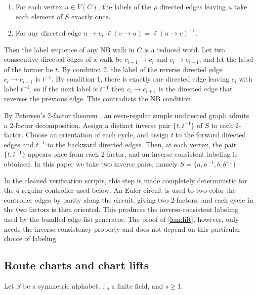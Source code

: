 \documentclass[11pt]{article}
\theoremstyle{definition}
\theoremstyle{remark}
\providecommand{\tightlist}{\setlength{\itemsep}{0pt}\setlength{\parskip}{0pt}}
\renewcommand{\_}{\textunderscore\allowbreak}
\begin{document}
\begin{enumerate}
\def\labelenumi{\arabic{enumi}.}
\tightlist
\item
  For each vertex \(u\in V(C)\), the labels of the \(\rho\) directed
  edges leaving \(u\) take each element of \(S\) exactly once.
\item
  For any directed edge \(u\to v\), \(\ell(v\to u)=\ell(u\to v)^{-1}\).
\end{enumerate}

Then the label sequence of any NB walk in \(C\) is a reduced word. Let
two consecutive directed edges of a walk be \(c_{i-1}\to c_i\) and
\(c_i\to c_{i+1}\), and let the label of the former be \(t\). By
condition 2, the label of the reverse directed edge \(c_i\to c_{i-1}\)
is \(t^{-1}\). By condition 1, there is exactly one directed edge
leaving \(c_i\) with label \(t^{-1}\), so if the next label is
\(t^{-1}\) then \(c_i\to c_{i+1}\) is the directed edge that reverses
the previous edge. This contradicts the NB condition.

By Petersen's 2-factor theorem \cite{Petersen1891}, an even-regular
simple undirected graph admits a 2-factor decomposition. Assign a
distinct inverse pair \(\{t,t^{-1}\}\) of \(S\) to each 2-factor. Choose
an orientation of each cycle, and assign \(t\) to the forward directed
edges and \(t^{-1}\) to the backward directed edges. Then, at each
vertex, the pair \(\{t,t^{-1}\}\) appears once from each 2-factor, and
an inverse-consistent labeling is obtained. In this paper we take two
inverse pairs, namely \(S=\{a,a^{-1},b,b^{-1}\}\).

In the cleaned verification scripts, this step is made completely
deterministic for the \(4\)-regular controller used below. An Euler
circuit is used to two-color the controller edges by parity along the
circuit, giving two \(2\)-factors, and each cycle in the two factors is
then oriented. This produces the inverse-consistent labeling used by the
bundled edge-list generator. The proof of \cref{lem:lift}, however, only needs
the inverse-consistency property and does not depend on this particular
choice of labeling.

\subsection{Route charts and chart
lifts}\label{a.4-route-charts-and-chart-lifts}

Let \(S\) be a symmetric alphabet, \(\mathbb F_q\) a finite field, and
\(s\ge1\).
\end{document}
